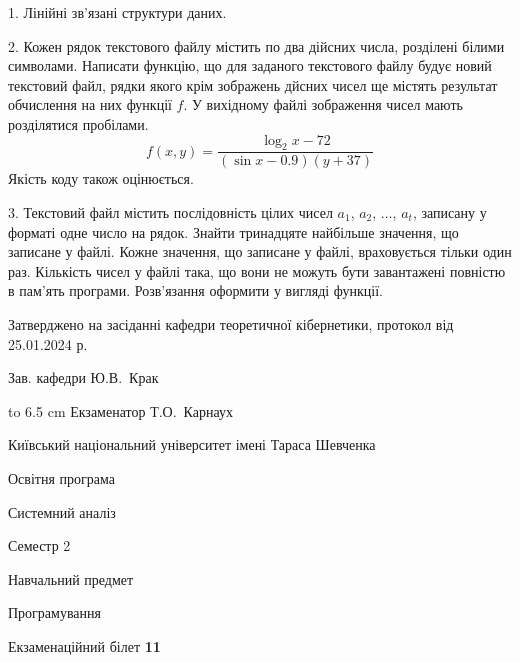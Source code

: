 \documentclass[12pt, ukrainian]{article}
\begin{document}
{%
1. Лінійні зв’язані структури даних.%
\par
\vspace{2mm}

2. Кожен рядок текстового файлу містить по два дійсних числа, розділені білими символами.
Написати функцію, що для заданого текстового файлу будує новий текстовий файл, рядки якого крім зображень дйсних чисел ще містять результат обчислення на них функції $f$. У вихідному файлі зображення чисел мають розділятися пробілами. 
$$f(x, y) =\frac{\log_{2} x - 72}{(\sin x - 0.9) (y + 37)}$$ 
Якість коду також оцінюється.

\par
\vspace{2mm}

3. Текстовий файл містить послідовність цілих чисел $a_1$, $a_2$, $\ldots$, $a_t$, записану у форматі одне число на рядок. Знайти тринадцяте найбільше значення, що записане у файлі. Кожне значення, що записане у файлі, враховується тільки один раз. Кількість чисел у файлі така, що вони не можуть бути завантажені повністю в пам'ять програми. Розв'язання оформити у вигляді функції.

}
{\smallskip\smallskip \begin {scriptsize} Затверджено на засіданні кафедри теоретичної кібернетики, протокол   від   25.01.2024 р.\par\smallskip\smallskip\smallskip\smallskip
{\parbox {6.5 cm} {Зав. кафедри \dotfill Ю.В.~Крак}}\hspace {0.7cm} {\hbox to 6.5 cm { Екзаменатор \dotfill Т.О.~Карнаух}} \end{scriptsize}}
\newpage
{{\begin {scriptsize}\par
{ \center  Київський національний університет імені Тараса Шевченка \par}
{\parbox {5 cm}{Освітня програма \hfill}{\parbox {7 cm}{Системний аналіз\hfill}}\parbox {6 cm}{\hfill Семестр 2}}\par
{\parbox {5 cm} {Навчальний предмет \hfill}\parbox {7 cm}{Програмування \hfill}\parbox {6cm}{\hfill}\par}\vspace{-15pt} \end{scriptsize}}{\center Екзаменаційний білет \No \textbf { 11 }\par}}
\end{document}
